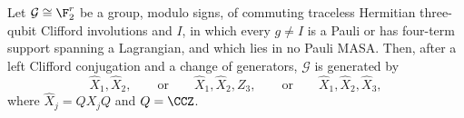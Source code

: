 Let $\mathcal G\cong\F_2^r$ be a group, modulo signs, of commuting traceless Hermitian three-qubit Clifford involutions and $I$, in which every $g\ne I$ is a Pauli or has four-term support spanning a Lagrangian, and which lies in no Pauli MASA\@. Then, after a left Clifford conjugation and a change of generators, $\mathcal G$ is generated by
\[
\hat X_1,\hat X_2,\qquad\text{or}\qquad \hat X_1,\hat X_2,Z_3,\qquad\text{or}\qquad \hat X_1,\hat X_2,\hat X_3,
\]
where $\hat X_j=QX_jQ$ and $Q=\CCZ$.
